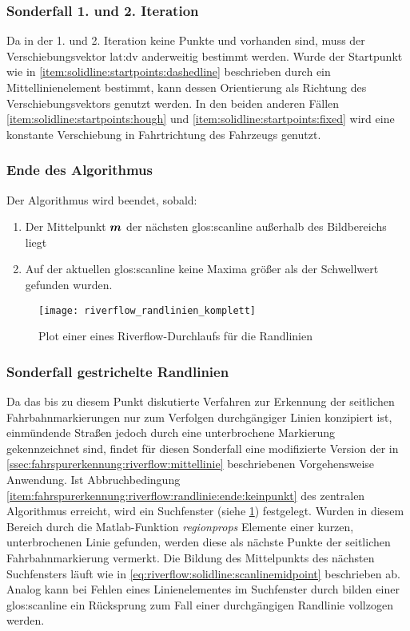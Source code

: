 \subsubsection{Sonderfall 1. und 2. Iteration}
Da in der 1. und 2. Iteration keine Punkte  und  vorhanden sind, muss der Verschiebungsvektor \gls{lat:dv} anderweitig bestimmt werden. 
Wurde der Startpunkt wie in \ref{item:solidline:startpoints:dashedline} beschrieben durch ein Mittellinienelement bestimmt, kann dessen Orientierung als Richtung des Verschiebungsvektors genutzt werden.
In den beiden anderen Fällen \ref{item:solidline:startpoints:hough} und \ref{item:solidline:startpoints:fixed} wird eine konstante Verschiebung in Fahrtrichtung des Fahrzeugs genutzt.

\subsubsection{Ende des Algorithmus}
Der Algorithmus wird beendet, sobald:
\begin{enumerate}
\item \label{item:fahrspurerkennung:riverflow:randlinie:ende:keinpunkt} 
Der Mittelpunkt \begin{math} \boldsymbol{m}  \end{math} der nächsten \gls{glos:scanline} außerhalb des Bildbereichs liegt
\item Auf der aktuellen \gls{glos:scanline} keine Maxima größer als der Schwellwert  gefunden wurden.
\end{enumerate}

\begin{figure}[htb]
  \centering
  \texttt{[image: riverflow\_randlinien\_komplett]}
  \caption{Plot einer eines Riverflow-Durchlaufs für die Randlinien}
  \label{fig:riverflow:randlinien:plot_komplett}
\end{figure}

\subsubsection{Sonderfall gestrichelte Randlinien}
Da das bis zu diesem Punkt diskutierte Verfahren zur Erkennung der seitlichen Fahrbahnmarkierungen nur zum Verfolgen durchgängiger Linien konzipiert ist, einmündende Straßen jedoch durch eine unterbrochene Markierung gekennzeichnet sind, findet für diesen Sonderfall eine modifizierte Version der in \ref{ssec:fahrspurerkennung:riverflow:mittellinie} beschriebenen Vorgehensweise Anwendung. Ist Abbruchbedingung \ref{item:fahrspurerkennung:riverflow:randlinie:ende:keinpunkt} des zentralen Algorithmus erreicht, wird ein Suchfenster (siehe \ref{fig:riverflow:randlinien:plot_komplett}) festgelegt. Wurden in diesem Bereich durch die Matlab-Funktion \emph{regionprops} Elemente einer kurzen, unterbrochenen Linie gefunden, werden diese als nächste Punkte der seitlichen Fahrbahnmarkierung vermerkt. Die Bildung des Mittelpunkts  des nächsten Suchfensters läuft wie in \eqref{eq:riverflow:solidline:scanlinemidpoint} beschrieben ab. Analog kann bei Fehlen eines Linienelementes im Suchfenster durch bilden einer \gls{glos:scanline} ein Rücksprung zum Fall einer durchgängigen Randlinie vollzogen werden.
